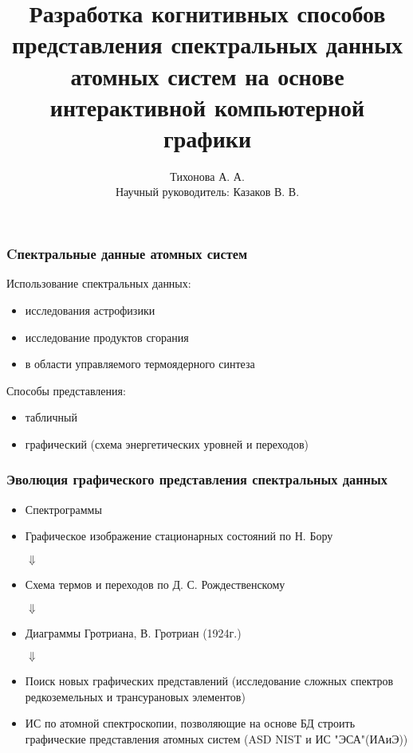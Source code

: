 \documentclass{beamer}
\title{Разработка когнитивных способов представления спектральных данных атомных систем на основе интерактивной компьютерной графики}
\author{Тихонова А. А. \\
        Научный руководитель: Казаков В. В.}
\institute{Новосибирский Государственный Университет}
\begin{document}
\begin{frame}
\titlepage
\end{frame}

\begin{frame}
\frametitle{Cпектральные данные атомных систем}
    Использование спектральных данных:
    \begin{itemize}
        \item исследования астрофизики
        \item исследование продуктов сгорания
        \item в области управляемого термоядерного синтеза
    \end{itemize}
    Способы представления:
    \begin{itemize}
        \item табличный
        \item графический (схема энергетических уровней и переходов)
    \end{itemize}
\end{frame}

\begin{frame}
\frametitle{Эволюция графического представления спектральных данных}
    \begin{itemize}
        \item Спектрограммы
        \item Графическое изображение стационарных состояний по Н. Бору\\\begin{center} {$\Downarrow$} \end{center}
        \item Схема термов и переходов по Д. С. Рождественскому\\\begin{center} {$\Downarrow$} \end{center}
        \item Диаграммы Гротриана, В. Гротриан (1924г.)\\\begin{center} {$\Downarrow$} \end{center}
        \item Поиск новых графических представлений (исследование сложных спектров редкоземельных и трансурановых элементов)
        \item ИС по атомной спектроскопии, позволяющие на основе БД строить графические представления атомных систем (ASD NIST и ИС "ЭСА"(ИАиЭ))
    \end{itemize}
\end{frame}
\end{document}

